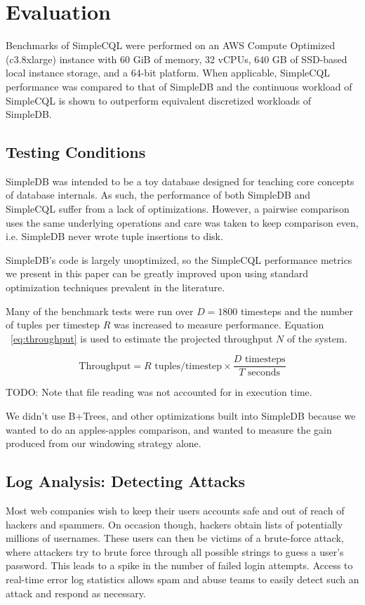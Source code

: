 \documentclass[a4paper, 10pt, conference]{IEEEconf}
\begin{document}
\section{Evaluation}
Benchmarks of SimpleCQL were performed on an AWS Compute Optimized (c3.8xlarge) instance with 60 GiB of memory, 32 vCPUs, 640 GB of SSD-based local instance storage, and a 64-bit platform.  When applicable, SimpleCQL performance was compared to that of SimpleDB and the continuous workload of SimpleCQL is shown to outperform equivalent discretized workloads of SimpleDB.  

\subsection{Testing Conditions}
SimpleDB was intended to be a toy database designed for teaching core concepts of database internals.  As such, the performance of both SimpleDB and SimpleCQL suffer from a lack of optimizations.  However, a pairwise comparison uses the same underlying operations and care was taken to keep comparison even, i.e. SimpleDB never wrote tuple insertions to disk.

SimpleDB’s code is largely unoptimized, so the SimpleCQL performance metrics we present in this paper can be greatly improved upon using standard optimization techniques prevalent in the literature. 

Many of the benchmark tests were run over $D = 1800$ timesteps and the number of tuples per timestep $R$ was increased to measure performance.  Equation ~\ref{eq:throughput} is used to estimate the projected throughput $N$ of the system.

\begin{equation} \label{eq:throughput}
    \text{Throughput} = R \text{ tuples/timestep} \times \dfrac{D \text{ timesteps}}{T \text{ seconds}}
\end{equation}


TODO: Note that file reading was not accounted for in execution time.

We didn't use B+Trees, and other optimizations built into SimpleDB because we wanted to do an apples-apples comparison, and wanted to measure the gain produced from our windowing strategy alone.

\subsection{Log Analysis: Detecting Attacks}
Most web companies wish to keep their users accounts safe and out of reach of hackers and spammers.  On occasion though, hackers obtain lists of potentially millions of usernames.  These users can then be victims of a brute-force attack, where attackers try to brute force through all possible strings to guess a user’s password. This leads to a spike in the number of failed login attempts. Access to real-time error log statistics allows spam and abuse teams to easily detect such an attack and respond as necessary.
\end{document}
